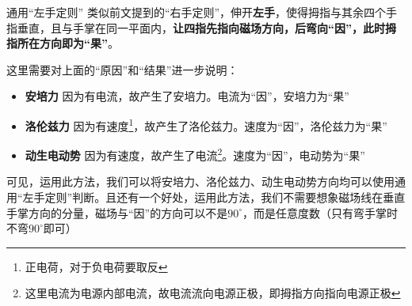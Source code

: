 \begin{theo}{通用“左手定则”}{}
类似前文提到的“右手定则”，伸开\textbf{左手}，使得拇指与其余四个手指垂直，且与手掌在同一平面内，\textbf{让四指先指向磁场方向，后弯向“因”，此时拇指所在方向即为“果”}。

这里需要对上面的“原因”和“结果”进一步说明：

\begin{itemize}
	\item \textbf{安培力} \quad 因为有电流，故产生了安培力。电流为“因”，安培力为“果”
	\item \textbf{洛伦兹力} \quad 因为有速度\footnote{正电荷，对于负电荷要取反}，故产生了洛伦兹力。速度为“因”，洛伦兹力为“果”
	\item \textbf{动生电动势} \quad 因为有速度，故产生了电流\footnote{这里电流为电源内部电流，故电流流向电源正极，即拇指方向指向电源正极}。速度为“因”，电动势为“果”
\end{itemize}

\end{theo}

可见，运用此方法，我们可以将安培力、洛伦兹力、动生电动势方向均可以使用通用“左手定则”判断。且还有一个好处，运用此方法，我们不需要想象磁场线在垂直手掌方向的分量，磁场与“因”的方向可以不是$90^{\circ}$，而是任意度数（只有弯手掌时不弯$90^{\circ}$即可）